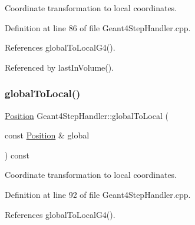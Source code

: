 Coordinate transformation to local coordinates. 



Definition at line 86 of file Geant4\+Step\+Handler.\+cpp.



References global\+To\+Local\+G4().



Referenced by last\+In\+Volume().

\hypertarget{class_d_d4hep_1_1_simulation_1_1_geant4_step_handler_acaf616fb9b9baa3c16a41995f810b985}{}\label{class_d_d4hep_1_1_simulation_1_1_geant4_step_handler_acaf616fb9b9baa3c16a41995f810b985} 
\subsubsection{\texorpdfstring{global\+To\+Local()}{globalToLocal()}\hspace{0.1cm}{\footnotesize\ttfamily [2/3]}}
{\footnotesize\ttfamily \hyperlink{namespace_d_d4hep_1_1_geometry_a55083902099d03506c6db01b80404900}{Position} Geant4\+Step\+Handler\+::global\+To\+Local (\begin{DoxyParamCaption}\item[{const \hyperlink{namespace_d_d4hep_1_1_geometry_a55083902099d03506c6db01b80404900}{Position} \&}]{global }\end{DoxyParamCaption}) const}



Coordinate transformation to local coordinates. 



Definition at line 92 of file Geant4\+Step\+Handler.\+cpp.



References global\+To\+Local\+G4().

\hypertarget{class_d_d4hep_1_1_simulation_1_1_geant4_step_handler_a9d7db51a7a7d6bc11853a4dddb49cc1d}{}\label{class_d_d4hep_1_1_simulation_1_1_geant4_step_handler_a9d7db51a7a7d6bc11853a4dddb49cc1d} 
